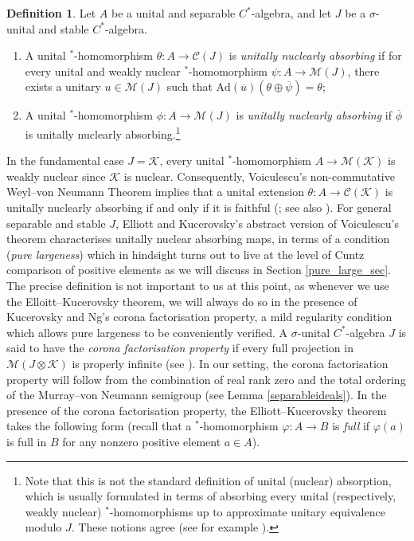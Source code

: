 \documentclass[reqno]{amsart}
\theoremstyle{definition}
\newtheorem{defn}[thm]{Definition}
\theoremstyle{remark}
\numberwithin{equation}{section}
\theoremstyle{definition}
\newcommand{\calC}{\mathcal{C}}
\newcommand{\calM}{\mathcal{M}}
\newcommand{\calK}{\mathcal{K}}
\begin{document}
\begin{defn} 
\label{unital_nuclear_absorb} 
Let $A$ be a unital and separable $C^*$-algebra, and let $J$ be a $\sigma$-unital and stable $C^*$-algebra. 
\begin{enumerate} 
\item A unital $^*$-homomorphism $\theta: A\rightarrow \calC(J)$ is \emph{unitally nuclearly absorbing} if for every unital and weakly nuclear $^*$-homomorphism $\psi: A\rightarrow \calM(J)$, there exists a unitary $u\in \calM(J)$ such that $\mathrm{Ad}(\overline{u}) (\theta\oplus \overline{\psi}) = \theta$; 
\item A unital $^*$-homomorphism $\phi: A\rightarrow \calM(J)$ is \emph{unitally nuclearly absorbing} if $\overline{\phi}$ is unitally nuclearly absorbing.\footnote{Note that this is not the standard definition of unital (nuclear) absorption, which is usually formulated in terms of absorbing every unital (respectively, weakly nuclear) $^*$-homomorphisms up to approximate unitary equivalence modulo $J$. These notions agree (see for example  \cite[Proposition 5.9]{CGSTW}).} 
\end{enumerate} 
\end{defn} 

In the fundamental case $J = \calK$, every unital $^*$-homomorphism $A\rightarrow \calM(\calK)$ is weakly nuclear since $\calK$ is nuclear. Consequently, Voiculescu’s non-commutative Weyl–von Neumann Theorem implies that a unital extension $\theta: A\rightarrow \calC(\calK)$ is unitally nuclearly absorbing if and only if it is faithful (\cite{Voiculescu}; see also \cite{Arveson:DJM}). For general separable and stable $J$, Elliott and Kucerovsky's abstract version of Voiculescu's theorem characterises unitally nuclear absorbing maps, in terms of a condition (\emph{pure largeness}) which in hindsight turns out to live at the level of Cuntz comparison of positive elements as we will discuss in Section \ref{pure_large_sec}. The precise definition is not important to us at this point, as whenever we use the Elloitt--Kucerovsky theorem, we will always do so in the presence of Kucerovsky and Ng's corona factorisation property, a mild regularity condition which allows pure largeness to be conveniently verified.  A  $\sigma$-unital $C^*$-algebra $J$ is said to have the \emph{corona factorisation property} if every full projection in $\calM(J\otimes \calK)$ is properly infinite (see \cite[Definition 2.1]{CFP_KN}). In our setting, the corona factorisation property will follow from the combination of real rank zero and the total ordering of the Murray--von Neumann semigroup  (see Lemma \ref{separableideals}).  In the presence of the corona factorisation property, the Elliott--Kucerovsky theorem takes the following form (recall that a $^*$-homomorphism $\varphi: A\rightarrow B$ is \emph{full} if $\varphi(a)$ is full in $B$ for any nonzero positive element $a\in A$).
\end{document}
